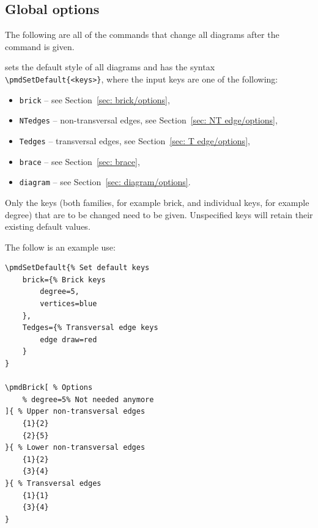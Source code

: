 \documentclass{ltxdoc}
\begin{document}
\subsection{Global options}

The following are all of the commands that change all diagrams after the command is given.

\DescribeMacro{\pmdSetDefault}
sets the default style of all diagrams and has the syntax \verb`\pmdSetDefault{<keys>}`, where the input keys are one of the following:
\begin{itemize}
    \item \texttt{brick} -- see Section~\ref{sec: brick/options},
    \item \texttt{NTedges} -- non-transversal edges, see Section~\ref{sec: NT edge/options},
    \item \texttt{Tedges} -- transversal edges, see Section~\ref{sec: T edge/options},
    \item \texttt{brace} -- see Section~\ref{sec: brace},
    \item \texttt{diagram} -- see Section~\ref{sec: diagram/options}.
\end{itemize}
Only the keys (both families, for example brick, and individual keys, for example degree) that are to be changed need to be given. Unspecified keys will retain their existing default values.

The follow is an example use:
\begin{center}
    \begin{minipage}{\dimexpr0.85\textwidth-2\fboxrule-2\fboxsep\relax}
        \begin{minipage}[c]{0.4\linewidth}
\begin{verbatim}
\pmdSetDefault{% Set default keys
    brick={% Brick keys
        degree=5,
        vertices=blue
    },
    Tedges={% Transversal edge keys
        edge draw=red
    }
}

\pmdBrick[ % Options
    % degree=5% Not needed anymore
]{ % Upper non-transversal edges
    {1}{2}
    {2}{5}
}{ % Lower non-transversal edges
    {1}{2}
    {3}{4}
}{ % Transversal edges
    {1}{1}
    {3}{4}
}
\end{verbatim}
        \end{minipage}
        \hfill
        \begin{minipage}[c]{0.4\linewidth}

        \end{minipage}
    \end{minipage}%
\end{center}
\end{document}
